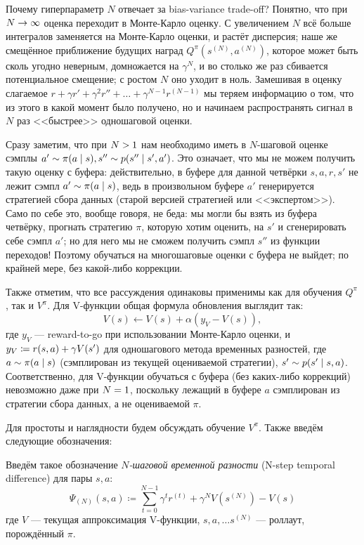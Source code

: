 Почему гиперпараметр $N$ отвечает за bias-variance trade-off? Понятно, что при $N \HM\to \infty$ оценка переходит в Монте-Карло оценку. С увеличением $N$ всё больше интегралов заменяется на Монте-Карло оценки, и растёт дисперсия; наше же смещённое приближение будущих наград $Q^{\pi}(s^{(N)}, a^{(N)})$, которое может быть сколь угодно неверным, домножается на $\gamma^N$, и во столько же раз сбивается потенциальное смещение; с ростом $N$ оно уходит в ноль. Замешивая в оценку слагаемое $r + \gamma r' + \gamma^2 r'' + \dots + \gamma^{N-1} r^{(N-1)}$ мы теряем информацию о том, что из этого в какой момент было получено, но и начинаем распространять сигнал в $N$ раз <<быстрее>> одношаговой оценки.

Сразу заметим, что при $N \HM> 1$ нам необходимо иметь в $N$-шаговой оценке сэмплы $a' \HM\sim \pi(a \HM\mid s), s'' \HM\sim p(s'' \mid s', a')$. Это означает, что мы не можем получить такую оценку с буфера: действительно, в буфере для данной четвёрки $s, a, r, s'$ не лежит сэмпл $a' \HM\sim \pi(a \HM\mid s)$, ведь в произвольном буфере $a'$ генерируется стратегией сбора данных (старой версией стратегией или <<экспертом>>). Само по себе это, вообще говоря, не беда: мы могли бы взять из буфера четвёрку, прогнать стратегию $\pi$, которую хотим оценить, на $s'$ и сгенерировать себе сэмпл $a'$; но для него мы не сможем получить сэмпл $s''$ из функции переходов! Поэтому обучаться на многошаговые оценки с буфера не выйдет; по крайней мере, без какой-либо коррекции.

Также отметим, что все рассуждения одинаковы применимы как для обучения $Q^\pi$, так и $V^\pi$. Для V-функции общая формула обновления выглядит так:
\begin{equation}\label{generalTD}
V(s) \leftarrow V(s) + \alpha \left( y_V - V(s) \right),
\end{equation}
где $y_V$ --- reward-to-go при использовании Монте-Карло оценки, и $y_V \HM \coloneqq r(s, a) \HM+ \gamma V(s')$ для одношагового метода временных разностей, где $a \HM \sim \pi(a \HM \mid s)$ (сэмплирован из текущей оцениваемой стратегии), $s' \HM \sim p(s' \HM\mid s, a)$. Соответственно, для V-функции обучаться с буфера (без каких-либо коррекций) невозможно даже при $N \HM= 1$, поскольку лежащий в буфере $a$ сэмплирован из стратегии сбора данных, а не оцениваемой $\pi$.

Для простоты и наглядности будем обсуждать обучение $V^\pi$. Также введём следующие обозначения:

\begin{definition}
Введём такое обозначение \emph{$N$-шаговой временной разности} (N-step temporal difference) для пары $s, a$:
\begin{equation}\label{Nstepadvantage}
\Psi_{(N)} (s, a) \coloneqq \sum_{t=0}^{N-1} \gamma^{t} r^{(t)} + \gamma^N V(s^{(N)}) - V(s)
\end{equation}
где $V$ --- текущая аппроксимация V-функции, $s, a, \dots s^{(N)}$ --- роллаут, порождённый $\pi$.
\end{definition}

